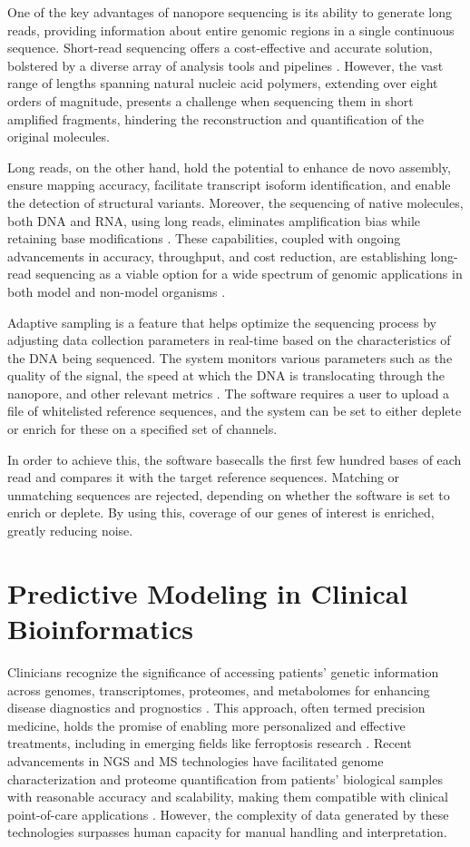 One of the key advantages of nanopore sequencing is its ability to generate long reads, providing information about entire genomic regions in a single continuous sequence. Short-read sequencing offers a cost-effective and accurate solution, bolstered by a diverse array of analysis tools and pipelines \citep{short_reads}. However, the vast range of lengths spanning natural nucleic acid polymers, extending over eight orders of magnitude, presents a challenge when sequencing them in short amplified fragments, hindering the reconstruction and quantification of the original molecules. 

Long reads, on the other hand, hold the potential to enhance de novo assembly, ensure mapping accuracy, facilitate transcript isoform identification, and enable the detection of structural variants. Moreover, the sequencing of native molecules, both DNA and RNA, using long reads, eliminates amplification bias while retaining base modifications \citep{long_read_adv}. These capabilities, coupled with ongoing advancements in accuracy, throughput, and cost reduction, are establishing long-read sequencing as a viable option for a wide spectrum of genomic applications in both model and non-model organisms \citep{long_read_adv2}.

Adaptive sampling is a feature that helps optimize the sequencing process by adjusting data collection parameters in real-time based on the characteristics of the DNA being sequenced. The system monitors various parameters such as the quality of the signal, the speed at which the DNA is translocating through the nanopore, and other relevant metrics \citep{ont_as}. The software requires a user to upload a file of whitelisted reference sequences, and the system can be set to either deplete or enrich for these on a specified set of channels. 

In order to achieve this, the software basecalls the first few hundred bases of each read and compares it with the target reference sequences. Matching or unmatching sequences are rejected, depending on whether the software is set to enrich or deplete. By using this, coverage of our genes of interest is enriched, greatly reducing noise.

\section{Predictive Modeling in Clinical Bioinformatics}

Clinicians recognize the significance of accessing patients' genetic information across genomes, transcriptomes, proteomes, and metabolomes for enhancing disease diagnostics and prognostics \citep{bioinf}. This approach, often termed precision medicine, holds the promise of enabling more personalized and effective treatments, including in emerging fields like ferroptosis research \citep{bioinf_ferro}. Recent advancements in \ac{NGS} and \ac{MS} technologies have facilitated genome characterization and proteome quantification from patients' biological samples with reasonable accuracy and scalability, making them compatible with clinical point-of-care applications \citep{ngs_cancer}. However, the complexity of data generated by these technologies surpasses human capacity for manual handling and interpretation.

